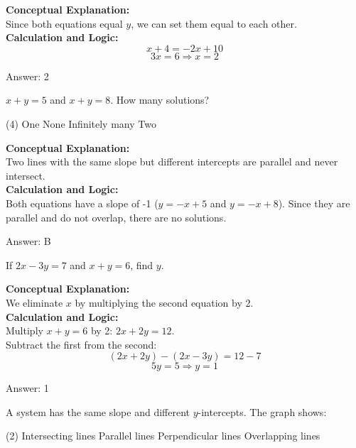 \documentclass[11pt,paper=a4,answers]{exam}
\begin{document}
\begin{questions}
\begin{solution}
\textbf{Conceptual Explanation:} \\
Since both equations equal $y$, we can set them equal to each other.
\\[10pt]
\textbf{Calculation and Logic:} \\
\[x + 4 = -2x + 10\]
\[3x = 6 \Rightarrow x = 2\]

\vspace{15pt}
Answer: \colorbox{yellow!100}{2}
\end{solution}

\question
$x + y = 5$ and $x + y = 8$. How many solutions?
\begin{tasks}(4)
    \task One
    \task None
    \task Infinitely many
    \task Two
\end{tasks}

\begin{solution}
\textbf{Conceptual Explanation:} \\
Two lines with the same slope but different intercepts are parallel and never intersect.
\\[10pt]
\textbf{Calculation and Logic:} \\
Both equations have a slope of -1 ($y = -x + 5$ and $y = -x + 8$). Since they are parallel and do not overlap, there are no solutions.

\vspace{15pt}
Answer: \colorbox{yellow!100}{B}
\end{solution}

\question
If $2x - 3y = 7$ and $x + y = 6$, find $y$.

\begin{solution}
\textbf{Conceptual Explanation:} \\
We eliminate $x$ by multiplying the second equation by 2.
\\[10pt]
\textbf{Calculation and Logic:} \\
Multiply $x + y = 6$ by 2: $2x + 2y = 12$. \\
Subtract the first from the second:
\[(2x + 2y) - (2x - 3y) = 12 - 7\]
\[5y = 5 \Rightarrow y = 1\]

\vspace{15pt}
Answer: \colorbox{yellow!100}{1}
\end{solution}

\question
A system has the same slope and different $y$-intercepts. The graph shows:
\begin{tasks}(2)
    \task Intersecting lines
    \task Parallel lines
    \task Perpendicular lines
    \task Overlapping lines
\end{tasks}


\end{questions}
\end{document}
